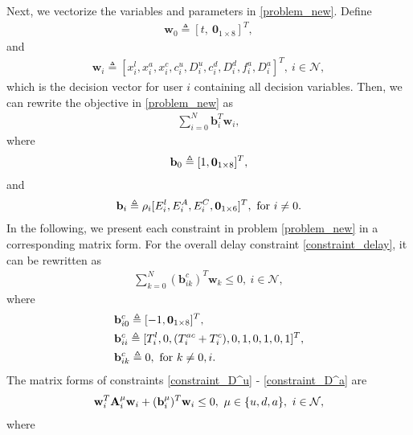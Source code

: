 \documentclass[10pt,journal,compsoc]{IEEEtran}
\begin{document}
Next, we vectorize the variables and parameters in
\eqref{problem_new}. Define
\begin{align}
\mathbf{w}_0\triangleq[t,\ \mathbf{0}_{1\times 8}]^T,
\end{align}
and
\begin{align}\label{def_w}
 \mathbf{w}_i\triangleq[x^l_{i}, x^a_{i},
x^c_{i},c^u_i,D^u_{i}, c^d_i,D^d_{i},f^a_i,D^a_{i}]^T,\
i\in\mathcal{N},
\end{align}
which is the decision vector for user $i$ containing all decision
variables.
Then, we can rewrite the objective in \eqref{problem_new} as
\begin{align}
\sum_{i=0}^N\mathbf{b}_i^T\mathbf{w}_i,\label{problem_QCQP.obj}
\end{align}
where
\begin{align}
\mathbf{b}_{0}\triangleq[1, \mathbf{0}_{1\times
8}]^T,\nonumber\allowdisplaybreaks
\end{align}
and
\begin{align}
\mathbf{b}_{i}\triangleq\rho_i[E^l_i, E^A_{i}, E^C_{i},
\mathbf{0}_{1\times 6}]^T,\ \mathrm{for}\ i \neq
0.\nonumber\allowdisplaybreaks
\end{align}
In the following, we present each constraint in problem
\eqref{problem_new} in a corresponding matrix form. For the overall
delay constraint \eqref{constraint_delay}, it can be rewritten as
\begin{align}
\sum_{k=0}^N({\mathbf{b}^c_{ik}})^T\mathbf{w}_k\leq 0,\
i\in\mathcal{N},\label{problem_QCQP.a}
\end{align}
where
\begin{align}
&\mathbf{b}^c_{i0}\triangleq[-1, \mathbf{0}_{1\times 8}]^T,\nonumber\allowdisplaybreaks\\
&\mathbf{b}^c_{ii}\triangleq[T^l_{i}, 0, (T^{ac}_i+T^c_{i}), 0, 1, 0, 1, 0, 1]^T,\nonumber\allowdisplaybreaks\\
&\mathbf{b}^c_{ik}\triangleq0,\ \mathrm{for}\ k\neq
0,i.\nonumber\allowdisplaybreaks
\end{align}
The matrix forms of constraints \eqref{constraint_D^u} -
\eqref{constraint_D^a} are
\begin{align}
\mathbf{w}_i^T\mathbf{A}^\mu_{i}\mathbf{w}_i+({\mathbf{b}^\mu_{i}})^T\mathbf{w}_i\leq
0,\ \mu\in\{u,d,a\},\
i\in\mathcal{N},\label{problem_QCQP.b}\allowdisplaybreaks
\end{align}
where
\end{document}
